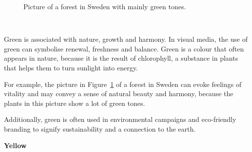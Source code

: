 \documentclass[../MasterThesis.tex]{subfiles}
\begin{document}
%
%
\begin{minipage}{0.5\textwidth}
	\begin{figure}[H]
		\begin{center}
			\caption[Picture of a forest in Sweden with mainly green tones.]{Picture of a forest in Sweden with mainly green tones.}
			\label{figure:green}
		\end{center}
	\end{figure}\hfill
\end{minipage}\begin{minipage}{0.05\textwidth}
	\ 
\end{minipage}\begin{minipage}{0.45\textwidth}
	Green is associated with nature, growth and harmony. In visual media, the use of green can symbolise renewal, freshness and balance. Green is a colour that often appears in nature, because it is the result of chlorophyll, a substance in plants that helps them to turn sunlight into energy.~\cite{green, colour2}
	
	For example, the picture in Figure~\ref{figure:green} of a forest in Sweden can evoke feelings of vitality and may convey a sense of natural beauty and harmony, because the plants in this picture show a lot of green tones.~\cite{greenwashing}
	

	
	
\end{minipage}

	
	\vspace*{-0.2em}

	Additionally, green is often used in environmental campaigns and eco-friendly branding to signify sustainability and a connection to the earth. 








\newpage
\textbf{\textcolor{YellowOrange}{Yellow}}
\end{document}
